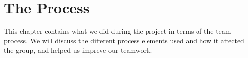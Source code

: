 \chapter{The Process}
This chapter contains what we did during the project in terms of the team process. We will discuss the different process elements used and how it affected the group, and helped us improve our teamwork.

